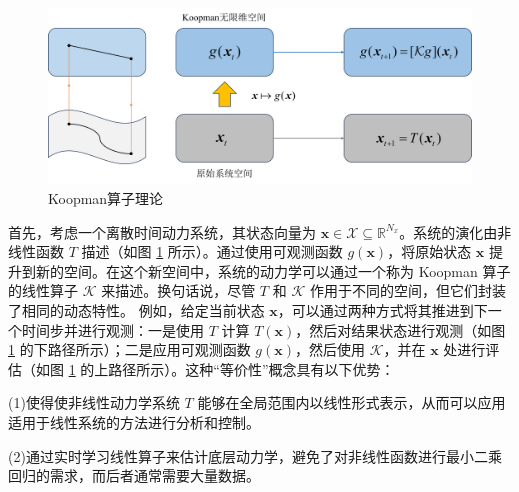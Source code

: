 \documentclass[lang=chs, degree=master, blindreview=true, winfonts=true]{yanputhesis}
\begin{document}
\begin{figure}[hbt!]
	\centering
	\includegraphics[width=37pc]{picture/3_1.png} 
	\caption{Koopman算子理论} \label{3_1}
\end{figure}
首先，考虑一个离散时间动力系统，其状态向量为 $\bm{x} \in \mathcal{X} \subseteq \mathbb{R}^{N_x}$。系统的演化由非线性函数 $T$ 描述（如图 \ref{3_1} 所示）。通过使用可观测函数 $g(\bm{x})$，将原始状态 $\bm{x}$ 提升到新的空间。在这个新空间中，系统的动力学可以通过一个称为 Koopman 算子的线性算子 $\mathcal{K}$ 来描述。换句话说，尽管 $T$ 和 $\mathcal{K}$ 作用于不同的空间，但它们封装了相同的动态特性。
例如，给定当前状态 $\bm{x}$，可以通过两种方式将其推进到下一个时间步并进行观测：一是使用 $T$ 计算 $T(\bm{x})$，然后对结果状态进行观测（如图 \ref{3_1} 的下路径所示）；二是应用可观测函数 $g(\bm{x})$，然后使用 $\mathcal{K}$，并在 $\bm{x}$ 处进行评估（如图 \ref{3_1} 的上路径所示）。这种“等价性”概念具有以下优势：

(1)使得使非线性动力学系统 \( T \) 能够在全局范围内以线性形式表示，从而可以应用适用于线性系统的方法进行分析和控制。

(2)通过实时学习线性算子来估计底层动力学，避免了对非线性函数进行最小二乘回归的需求，而后者通常需要大量数据。



\end{document}
